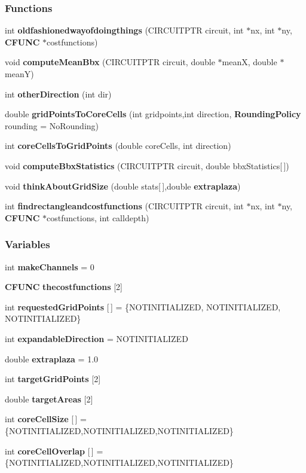 \subsubsection*{Functions}
\begin{CompactItemize}
\item 
int {\bf oldfashionedwayofdoingthings} (CIRCUITPTR circuit, int $\ast$nx, int $\ast$ny, {\bf CFUNC} $\ast$costfunctions)
\item 
void {\bf compute\-Mean\-Bbx} (CIRCUITPTR circuit, double $\ast$mean\-X, double $\ast$mean\-Y)
\item 
int {\bf other\-Direction} (int dir)
\item 
double {\bf grid\-Points\-To\-Core\-Cells} (int gridpoints,int direction, {\bf Rounding\-Policy} rounding = No\-Rounding)
\item 
int {\bf core\-Cells\-To\-Grid\-Points} (double core\-Cells, int direction)
\item 
void {\bf compute\-Bbx\-Statistics} (CIRCUITPTR circuit, double bbx\-Statistics[$\,$])
\item 
void {\bf think\-About\-Grid\-Size} (double stats[$\,$],double {\bf extraplaza})
\item 
int {\bf findrectangleandcostfunctions} (CIRCUITPTR circuit, int $\ast$nx, int $\ast$ny, {\bf CFUNC} $\ast$costfunctions, int calldepth)
\end{CompactItemize}
\subsubsection*{Variables}
\begin{CompactItemize}
\item 
int {\bf make\-Channels} = 0
\item 
{\bf CFUNC} {\bf thecostfunctions} [2]
\item 
int {\bf requested\-Grid\-Points} [$\,$] = \{NOTINITIALIZED, NOTINITIALIZED, NOTINITIALIZED\}
\item 
int {\bf expandable\-Direction} = NOTINITIALIZED
\item 
double {\bf extraplaza} = 1.0
\item 
int {\bf target\-Grid\-Points} [2]
\item 
double {\bf target\-Areas} [2]
\item 
int {\bf core\-Cell\-Size} [$\,$] = \{NOTINITIALIZED,NOTINITIALIZED,NOTINITIALIZED\}
\item 
int {\bf core\-Cell\-Overlap} [$\,$] = \{NOTINITIALIZED,NOTINITIALIZED,NOTINITIALIZED\}
\end{CompactItemize}


